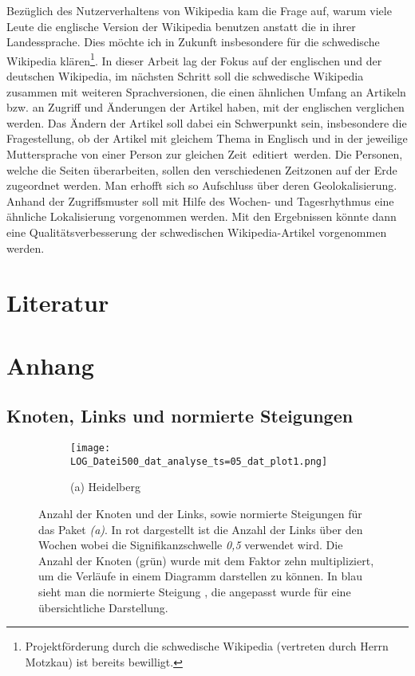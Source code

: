 \documentclass[fontsize=11pt, twoside, a4paper]{scrartcl}
\begin{document}
Bezüglich des Nutzerverhaltens von Wikipedia kam die Frage auf, warum viele Leute die englische Version der Wikipedia benutzen anstatt die in ihrer Landessprache. Dies möchte ich in Zukunft insbesondere für die schwedische Wikipedia klären\footnote{Projektförderung durch die schwedische Wikipedia (vertreten durch Herrn Motzkau) ist bereits bewilligt.}. In dieser Arbeit lag der Fokus auf der englischen und der deutschen Wikipedia, im nächsten Schritt soll die schwedische Wikipedia zusammen mit weiteren Sprachversionen, die einen ähnlichen Umfang an Artikeln bzw. an Zugriff und Änderungen der Artikel haben, mit der englischen verglichen werden. Das Ändern der Artikel soll dabei ein Schwerpunkt sein, insbesondere die Fragestellung, ob der Artikel mit gleichem Thema in Englisch und in der jeweilige Muttersprache von einer Person zur gleichen Zeit \,\glqq editiert\grqq\, werden. Die Personen, welche die Seiten überarbeiten, sollen den verschiedenen Zeitzonen auf der Erde zugeordnet werden. Man erhofft sich so Aufschluss über deren Geolokalisierung. Anhand der Zugriffsmuster soll mit Hilfe des Wochen- und Tagesrhythmus eine ähnliche Lokalisierung vorgenommen werden. Mit den Ergebnissen könnte dann eine Qualitätsverbesserung der schwedischen Wikipedia-Artikel vorgenommen werden.
\newpage
\section{Literatur}
\renewcommand\refname{}
\printbibliography

\newpage
\makeatletter
\renewcommand{\thesection}{\Alph{section}}
\setcounter{section}{0}
\section{Anhang}
\renewcommand{\thesubsection}{\Roman{subsection}}
\setcounter{subsection}{0}
\subsection{Knoten, Links und normierte Steigungen}
\begin{figure}[H]
\centering
	\begin{minipage}[t]{0.75\textwidth}
		\begin{figure}[H]
		\texttt{[image: LOG\_Datei500\_dat\_analyse\_ts=05\_dat\_plot1.png]}
		\caption*{(a) Heidelberg}
		\end{figure}
	\end{minipage}

\caption{Anzahl der Knoten und der Links, sowie normierte Steigungen für das Paket \textit{(a)}. In rot dargestellt ist die Anzahl der Links über den Wochen wobei die Signifikanzschwelle \textit{0,5} verwendet wird. Die Anzahl der Knoten (grün) wurde mit dem Faktor zehn multipliziert, um die Verläufe in einem Diagramm darstellen zu können. In blau sieht man die normierte Steigung , die angepasst wurde für eine übersichtliche Darstellung.}	
\label{nodes}
\end{figure}
\end{document}
